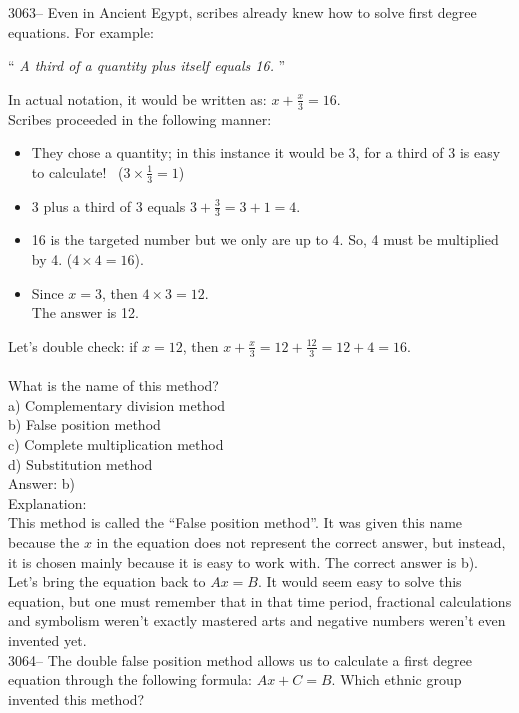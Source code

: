 \documentclass[letterpaper, 12pt]{article}
\begin{document}
3063-- Even in Ancient Egypt, scribes already knew how to solve first degree equations. For example:
\begin{center}
`` \emph{A third of a quantity plus itself equals 16.} ''\\
\end{center}
In actual notation, it would be written as: $x + \frac{x}{3} = 16$.\\[2mm]
Scribes proceeded in the following manner:\\
\begin{itemize}
\item They chose a quantity; in this instance it would be 3, for a third of 3 is easy to calculate! \ ($3\times \frac{1}{3} = 1$)
\item 3 plus a third of 3 equals $3 + \frac{3}{3} = 3 + 1 = 4$.
\item 16 is the targeted number but we only are up to 4. So, 4 must be multiplied by 4. ($4 \times 4 = 16$).
\item Since $x = 3$, then $4 \times 3 = 12$.\\
The answer is 12.
\end{itemize}
Let's double check: if $x = 12$, then $x + \frac{x}{3} = 12 + \frac{12}{3} = 12 + 4 = 16$.\\
\\
What is the name of this method?\\

a) Complementary division method\\
b) False position method\\
c) Complete multiplication method\\
d) Substitution method\\

Answer: b)\\

Explanation:\\
This method is called the ``False position method''. It was given this name because the $x$ in the equation does not represent the correct answer, but instead, it is chosen mainly because it is easy to work with. The correct answer is b). Let's bring the equation back to $Ax = B$. It would seem easy to solve this equation, but one must remember that in that time period, fractional calculations and symbolism weren't exactly mastered arts and negative numbers weren't even invented yet.\\



3064-- The double false position method allows us to calculate a first degree equation through the following formula: $Ax + C = B$. Which ethnic group invented this method?\\
\end{document}
